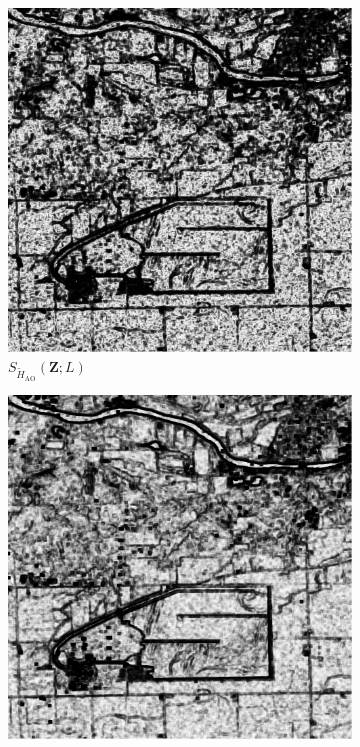 \begin{figure}[H]
  \centering
  \begin{subfigure}[b]{0.3\textwidth}
    \centering
    \includegraphics[width=\textwidth]{../../Figures/PNG/H_pvalue_Illinois_1024_36L_AO_200b}
    \caption{$S_{\widetilde{H}_{\text{AO}}}(\bm{Z}; L)$}
    \label{fig:Illinois_crops_pvalue-1}
  \end{subfigure}
  \hfill
  \begin{subfigure}[b]{0.3\textwidth}
    \centering
    \includegraphics[width=\textwidth]{../../Figures/PNG/cv_pvalues_Illinois_crops_1024}

\end{subfigure}
\end{figure}
